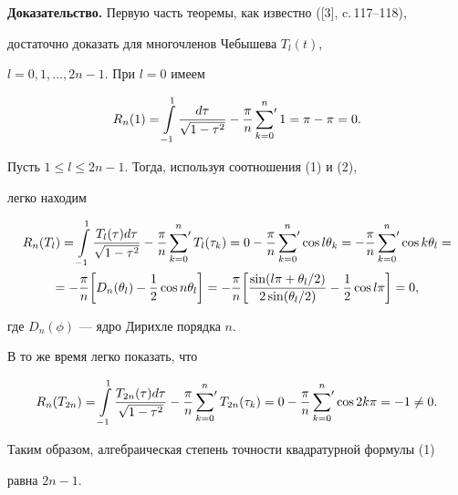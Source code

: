 {\bf Доказательство.} Первую часть теоремы, как известно ([3], c.\,117--118),


достаточно доказать для многочленов Чебышева $T_l(t)$,


$l= 0,1, \dotsc,2n-1$. При $l=0$  имеем


$$


R_n(1)= \int \limits_{-1}^1 \frac{ d \tau}{ \sqrt{1- \tau^2 } } - \frac{


\pi}{n}\sideset{}{'}\sum_{k=0}^n 1= \pi- \pi=0.


$$


Пусть $1 \leq l \leq 2n-1 $. Тогда, используя соотношения (1) и (2),


легко находим


\begin{gather*}


R_n(T_l) = \int \limits_{-1}^1 \frac{T_l( \tau) d \tau}{ \sqrt{1-


\tau^2}} - \frac{ \pi}{n} \sideset{}{'}\sum_{k=0}^n T_l( \tau_k) =


0 - \frac{ \pi}{n} \sideset{}{'}\sum_{k=0}^n


\cos l \theta_k = - \frac{ \pi}{n}


\sideset{}{'}\sum_{k=0}^n \cos k \theta_l = \\


%


= - \frac{ \pi}{n} \bigg[D_n( \theta_l) - \frac{1}{2} \cos n \theta_l\bigg]=


- \frac{\pi}{n} \bigg[\frac{ \sin(l \pi + \theta_l/2)}{2 \sin (\theta_l/2)} -


\frac{1}{2} \cos l \pi\bigg] = 0,


\end{gather*}


где $D_n( \phi)$ --- ядро Дирихле порядка $n$.


В то же время легко показать, что


$$


R_n(T_{2n}) = \int \limits_{-1}^1 \frac{T_{2n}( \tau) d \tau}{ \sqrt{1-


\tau^2}}- \frac{ \pi}{n} \sideset{}{'}\sum_{k=0}^n T_{2n}( \tau_k)=


0 - \frac{ \pi}{n} \sideset{}{'}\sum_{k=0}^n \cos 2k \pi = -1 \neq 0.


$$


Таким образом, алгебраическая степень точности квадратурной формулы (1)


равна $ 2n -1 $.





